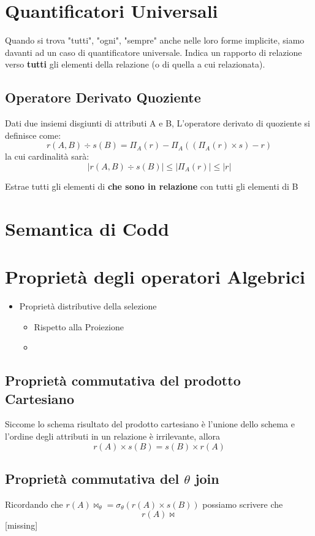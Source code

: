 \documentclass[10pt,twocolumn]{article}
\begin{document}
\section{Quantificatori Universali}
Quando si trova "tutti", "ogni", "sempre" anche nelle loro forme implicite, siamo davanti ad un caso di quantificatore universale. Indica un rapporto di relazione verso \textbf{tutti} gli elementi della relazione (o di quella a cui relazionata).
\subsection{Operatore Derivato Quoziente}
Dati due insiemi disgiunti di attributi A e B, L'operatore derivato di quoziente si definisce come: \[
r(A,B) \div s(B) = \Pi_A(r) - \Pi_A((\Pi_A(r) \times s)-r)
\]
la cui cardinalità sarà: \[
|r(A,B) \div  s(B)| \leq |\Pi_A(r) |\leq |r|
\]

Estrae tutti gli elementi di \textbf{che sono in relazione} con tutti gli elementi di B
\section{Semantica di Codd}
\section{Proprietà degli operatori Algebrici}
\begin{itemize}
    \item Proprietà distributive della selezione
    \begin{itemize}
        \item \hypertarget{Proiezione}{Rispetto alla Proiezione}
        \item \hypertarget{}{}
        
    \end{itemize}
\end{itemize}
\subsection{Proprietà commutativa del prodotto Cartesiano}
Siccome lo schema risultato del prodotto cartesiano è l'unione dello schema e l'ordine degli attributi in un relazione è irrilevante, allora \[r(A) \times s(B) = s(B) \times r(A)  \]
\subsection{Proprietà commutativa del $\theta$ join}
Ricordando che $r(A) \bowtie_\theta = \sigma_\theta(r(A) \times s(B))$
possiamo scrivere che \[ r(A) \bowtie\] [missing]
\end{document}
